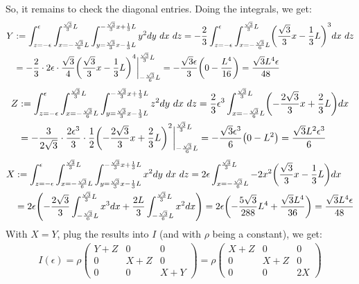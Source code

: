 \documentclass{article}
\DeclarePairedDelimiter{\paran}{(}{)}%
\begin{document}
So, it remains to check the diagonal entries. Doing the integrals, we get:
\begin{align}
    Y&:=\int_{z=-\epsilon}^{\epsilon}\int_{x=-\frac{\sqrt{3}}{6}L}^{\frac{\sqrt{3}}{3}L}\int_{y=\frac{\sqrt{3}}{3}x-\frac{1}{3}L}^{-\frac{\sqrt{3}}{3}x+\frac{1}{3}L}y^2dy\ dx\ dz = -\frac{2}{3}\int_{z=-\epsilon}^{\epsilon}\int_{x=-\frac{\sqrt{3}}{6}L}^{\frac{\sqrt{3}}{3}L}\paran*{\frac{\sqrt{3}}{3}x-\frac{1}{3}L}^3 dx\ dz\\
    &= -\frac{2}{3}\cdot 2\epsilon\cdot \frac{\sqrt{3}}{4}\paran*{\frac{\sqrt{3}}{3}x-\frac{1}{3}L}^4\bigg|_{-\frac{\sqrt{3}}{6}L}^{\frac{\sqrt{3}}{3}L}= -\frac{\sqrt{3}\epsilon}{3}\paran*{0-\frac{L^4}{16}} = \frac{\sqrt{3}L^4\epsilon}{48}
\end{align}
\begin{align}
    Z&:=\int_{z=-\epsilon}^{\epsilon}\int_{x=-\frac{\sqrt{3}}{6}L}^{\frac{\sqrt{3}}{3}L}\int_{y=\frac{\sqrt{3}}{3}x-\frac{1}{3}L}^{-\frac{\sqrt{3}}{3}x+\frac{1}{3}L}z^2 dy\ dx\ dz= \frac{2}{3}\epsilon^3\int_{x=-\frac{\sqrt{3}}{6}L}^{\frac{\sqrt{3}}{3}L}\paran*{-\frac{2\sqrt{3}}{3}x+\frac{2}{3}L}dx\\
    &= -\frac{3}{2\sqrt{3}}\cdot \frac{2\epsilon^3}{3}\cdot\frac{1}{2}\paran*{-\frac{2\sqrt{3}}{3}x+\frac{2}{3}L}^2\bigg|_{-\frac{\sqrt{3}}{6}L}^{\frac{\sqrt{3}}{3}L}= -\frac{\sqrt{3}\epsilon^3}{6}\paran*{0-L^2} = \frac{\sqrt{3}L^2\epsilon^3}{6}
\end{align}
\begin{align}
    X&:= \int_{z=-\epsilon}^{\epsilon}\int_{x=-\frac{\sqrt{3}}{6}L}^{\frac{\sqrt{3}}{3}L}\int_{y=\frac{\sqrt{3}}{3}x-\frac{1}{3}L}^{-\frac{\sqrt{3}}{3}x+\frac{1}{3}L}x^2 dy\ dx\ dz= 2\epsilon \int_{x=-\frac{\sqrt{3}}{6}L}^{\frac{\sqrt{3}}{3}L}-2x^2\paran*{\frac{\sqrt{3}}{3}x-\frac{1}{3}L}dx\\
    &= 2\epsilon\paran*{
        -\frac{2\sqrt{3}}{3}\int_{-\frac{\sqrt{3}}{6}L}^{\frac{\sqrt{3}}{3}L}x^3dx + \frac{2L}{3}\int_{-\frac{\sqrt{3}}{6}L}^{\frac{\sqrt{3}}{3}L}x^2dx
    }= 2\epsilon\paran*{
        -\frac{5\sqrt{3}}{288}L^4+\frac{\sqrt{3}L^4}{36}
    }=\frac{\sqrt{3}L^4\epsilon}{48}
\end{align}
With $X=Y$, plug the results into $I$ (and with $\rho$ being a constant), we get:
\begin{align}
    I(\epsilon)=\rho\begin{pmatrix}
        Y+Z&0&0\\
        0&X+Z&0\\
        0&0&X+Y
    \end{pmatrix} = \rho \begin{pmatrix}
        X+Z&0&0\\
        0&X+Z&0\\
        0&0&2X
    \end{pmatrix}
\end{align}
\end{document}
